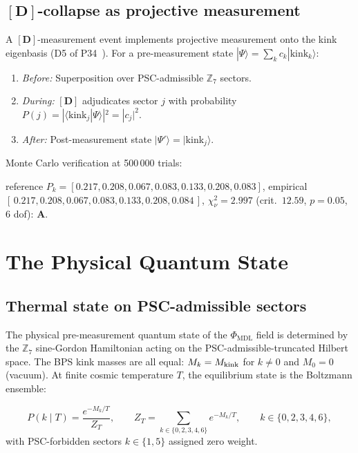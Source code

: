\documentclass[11pt]{article}
\theoremstyle{remark}
\newcommand{\PHIMDL}{\Phi_{\mathrm{MDL}}}
\newcommand{\ZS}{\mathbb{Z}_7}
\newcommand{\Mkink}{M_{\rm kink}}
\newcommand{\CatA}{\textbf{A}}
\begin{document}
\subsection{$[\mathbf{D}]$-collapse as projective measurement}
\label{ssec:collapse}

A $[\mathbf{D}]$-measurement event implements projective measurement onto the
kink eigenbasis (D5 of P34~\cite{SpivackGTEMobius}).  For a pre-measurement
state $|\Psi\rangle = \sum_k c_k|\text{kink}_k\rangle$:
\begin{enumerate}[noitemsep]
  \item \emph{Before:} Superposition over PSC-admissible $\ZS$ sectors.
  \item \emph{During:} $[\mathbf{D}]$ adjudicates sector $j$ with probability
    $P(j) = |\langle\text{kink}_j|\Psi\rangle|^2 = |c_j|^2$.
  \item \emph{After:} Post-measurement state $|\Psi'\rangle = |\text{kink}_j\rangle$.
\end{enumerate}
Monte Carlo verification at 500\,000 trials:
\begin{sloppypar}\noindent
reference $P_k=[0.217, 0.208, 0.067, 0.083, 0.133, 0.208, 0.083]$, empirical
$[\,0.217, 0.208, 0.067, 0.083, 0.133, 0.208, 0.084\,]$,
$\chi^2_\nu=2.997$ (crit.\ $12.59$, $p=0.05$, 6 dof): \CatA{}.
\end{sloppypar}

\section{The Physical Quantum State}
\label{sec:state}

\subsection{Thermal state on PSC-admissible sectors}
\label{ssec:thermal}

The physical pre-measurement quantum state of the $\PHIMDL$ field is determined
by the $\ZS$ sine-Gordon Hamiltonian acting on the PSC-admissible-truncated
Hilbert space.  The BPS kink masses are all equal: $M_k = \Mkink$ for $k\neq 0$
and $M_0 = 0$ (vacuum).  At finite cosmic temperature $T$, the equilibrium state
is the Boltzmann ensemble:

\begin{equation}
  P(k \mid T) = \frac{e^{-M_k/T}}{Z_T},
  \qquad
  Z_T = \sum_{k\in\{0,2,3,4,6\}} e^{-M_k/T},
  \qquad k\in\{0,2,3,4,6\},
  \label{eq:thermal}
\end{equation}
with PSC-forbidden sectors $k\in\{1,5\}$ assigned zero weight.
\end{document}
